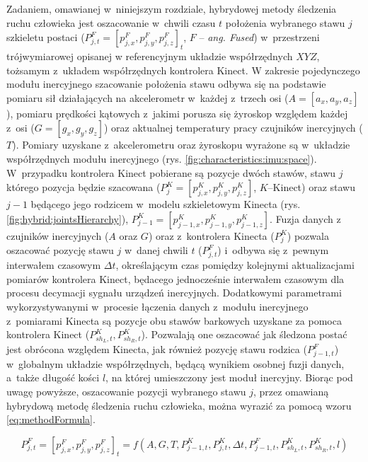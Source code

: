 Zadaniem, omawianej w~niniejszym rozdziale, hybrydowej metody śledzenia ruchu człowieka jest oszacowanie w~chwili czasu $t$ położenia wybranego stawu $j$ szkieletu postaci ($P^F_{j,t} = [p^F_{j,x}, p^F_{j,y}, p^F_{j,z}]_t$, $F$ -- \emph{ang. Fused})  w~przestrzeni trójwymiarowej opisanej w referencyjnym układzie współrzędnych $X Y Z$, tożsamym z~układem współrzędnych kontrolera Kinect. W zakresie pojedynczego modułu inercyjnego szacowanie położenia stawu odbywa się na podstawie pomiaru sił działających na akcelerometr w~każdej z~trzech osi ($A = [a_x, a_y, a_z]$), pomiaru prędkości kątowych z~jakimi porusza się żyroskop względem każdej z~osi ($G = [g_x, g_y, g_z]$) oraz aktualnej temperatury pracy czujników inercyjnych ($T$). Pomiary uzyskane z~akcelerometru oraz żyroskopu wyrażone są w~układzie współrzędnych modułu inercyjnego (rys. \ref{fig:characteristics:imu:space}). W~przypadku kontrolera Kinect pobierane są pozycje dwóch stawów, stawu $j$ którego pozycja będzie szacowana ($P^K_{j} = [p^K_{j,x}, p^K_{j,y}, p^K_{j,z}]$, $K$--Kinect) oraz stawu $j-1$ będącego jego rodzicem w~modelu szkieletowym Kinecta (rys. \ref{fig:hybrid:jointsHierarchy}), $P^K_{j-1} = [p^K_{j-1,x},p^K_{j-1,y}, p^K_{j-1,z}]$. Fuzja danych z czujników inercyjnych ($A$ oraz $G$) oraz z~kontrolera Kinecta ($P^K_j$) pozwala oszacować pozycję stawu $j$ w~danej chwili $t$ ($P^F_{j,t}$) i~odbywa się z~pewnym interwałem czasowym $\Delta t$, określającym czas pomiędzy kolejnymi aktualizacjami pomiarów kontrolera Kinect, będacego jednocześnie interwałem czasowym dla procesu decymacji sygnału urządzeń inercyjnych. Dodatkowymi parametrami wykorzystywanymi w~procesie łączenia danych z~modułu inercyjnego z~pomiarami Kinecta są pozycje obu stawów barkowych uzyskane za pomoca kontrolera Kinect ($P^K_{sh_L,t}, P^K_{sh_R,t}$). Pozwalają one oszacować jak śledzona postać jest obrócona względem Kinecta, jak również pozycję stawu rodzica ($P^F_{j-1,t}$) w~globalnym układzie współrzędnych, będącą wynikiem osobnej fuzji danych, a~także długość kości $l$, na której umieszczony jest moduł inercyjny. Biorąc pod uwagę powyższe, oszacowanie pozycji wybranego stawu $j$, przez omawianą hybrydową metodę śledzenia ruchu człowieka, można wyrazić za pomocą wzoru \ref{eq:methodFormula}.
		
\begin{equation}
	P^F_{j,t} = [p_{j,x}^F,p_{j,y}^F,p_{j,z}^F]_t = f(A,G,T,P_{j-1,t}^K,P_{j,t}^K,\Delta t, P^F_{j-1,t}, P^K_{sh_L,t},P^K_{sh_R,t},l) 
	\label{eq:methodFormula}
\end{equation}
		
